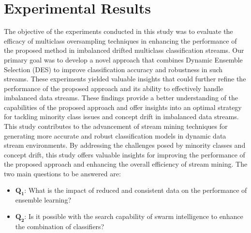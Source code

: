 %
%



\section{Experimental Results}
\label{sec:4_5_Expsetup}

The objective of the experiments conducted in this study was to evaluate the efficacy of multiclass oversampling techniques in enhancing the performance of the proposed method in imbalanced drifted multiclass classification streams. Our primary goal was to develop a novel approach that combines Dynamic Ensemble Selection (DES) to improve classification accuracy and robustness in such streams. These experiments yielded valuable insights that could further refine the performance of the proposed approach and its ability to effectively handle imbalanced data streams. These findings provide a better understanding of the capabilities of the proposed approach and offer insights into an optimal strategy for tackling minority class issues and concept drift in imbalanced data streams. This study contributes to the advancement of stream mining techniques for generating more accurate and robust classification models in dynamic data stream environments. By addressing the challenges posed by minority classes and concept drift, this study offers valuable insights for improving the performance of the proposed approach and enhancing the overall efficiency of stream mining. The two main questions to be answered are:

\begin{itemize}
  
      \item $\pmb{Q_1}$: What is the impact of reduced and consistent data on the performance of ensemble learning?
      \item  $\pmb{Q_2}$: Is it possible with the search capability of swarm intelligence to enhance the combination of classifiers? 
  \end{itemize}

